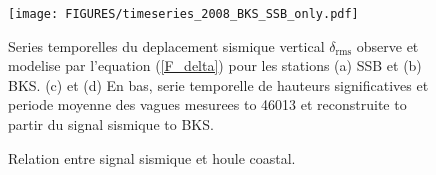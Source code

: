 \begin{figure}
\centerline{\texttt{[image: FIGURES/timeseries\_2008\_BKS\_SSB\_only.pdf]}}
  \caption{Relation entre signal sismique et houle coastal.}{Series temporelles du deplacement sismique vertical $\delta_{\mathrm{rms}}$
observe et modelise par l'equation (\ref{F_delta}) pour les stations (a) SSB et (b) BKS. 
(c) et (d) En bas, serie temporelle de hauteurs significatives et periode moyenne des vagues mesurees to 46013 et reconstruite to partir du signal sismique to BKS. 
}
\label{fig:sismo_timeseries}
\end{figure}



